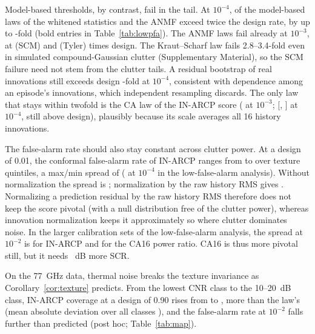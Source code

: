 \documentclass[journal]{IEEEtran}
\begin{document}
Model-based thresholds, by contrast, fail in the tail. At $10^{-4}$, \NWhitenedLawsFail{} of the \NWhitenedLaws{} model-based laws of the whitened statistics and the ANMF exceed twice the design rate, by up to \LAnalMaxFour-fold (bold entries in Table~\ref{tab:lowpfa}). The ANMF laws fail already at $10^{-3}$, at \LScmThree{} (SCM) and \LFpThree{} (Tyler) times design. The Kraut--Scharf law fails 2.8--3.4-fold even in simulated compound-Gaussian clutter (Supplementary Material), so the SCM failure need not stem from the clutter tails. A residual bootstrap of real innovations still exceeds design \LBootFour-fold at $10^{-4}$, consistent with dependence among an episode's innovations, which independent resampling discards. The only law that stays within twofold is the CA law of the IN-ARCP score (\LInAnalThree{} at $10^{-3}$; \LInAnalFour{} [\InAnalFourLo, \InAnalFourHi] at $10^{-4}$, still above design), plausibly because its scale averages all 16 history innovations.

The false-alarm rate should also stay constant across clutter power. At a design of 0.01, the conformal false-alarm rate of IN-ARCP ranges from \QPfaINMin{} to \QPfaINMax{} over texture quintiles, a max/min spread of \QPfaINSpread{} (\LInConfSpreadFour{} at $10^{-4}$ in the low-false-alarm analysis). Without normalization the spread is \QPfaUSpread; normalization by the raw history RMS gives \QPfaRMSSpread. Normalizing a prediction residual by the raw history RMS therefore does not keep the score pivotal (with a null distribution free of the clutter power), whereas innovation normalization keeps it approximately so where clutter dominates noise. In the larger calibration sets of the low-false-alarm analysis, the spread at $10^{-2}$ is \NetSpreadInIpix{} for IN-ARCP and \NetSpreadCaIpix{} for the CA16 power ratio. CA16 is thus more pivotal still, but it needs \DetINGainCAHalf~dB more SCR.

On the 77~GHz data, thermal noise breaks the texture invariance as Corollary~\ref{cor:texture} predicts. From the lowest CNR class to the 10--20~dB class, IN-ARCP coverage at a design of 0.90 rises from \JInLow{} to \JInHigh{}, more than the law's \JPredHigh{} (mean absolute deviation over all classes \JMae), and the false-alarm rate at $10^{-2}$ falls further than predicted (post hoc; Table~\ref{tab:map}).
\end{document}
